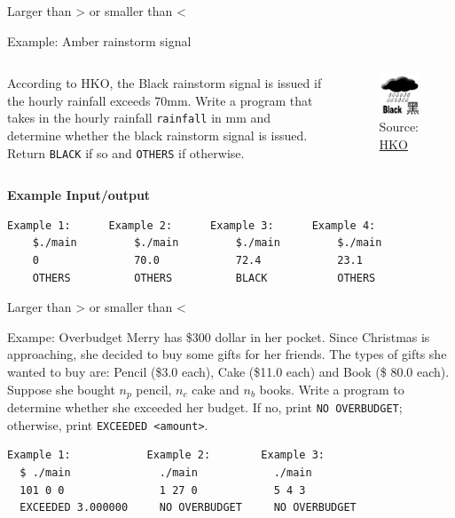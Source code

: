 \documentclass[10pt,xcolor={table,dvipsnames},t]{beamer}
\begin{document}
\begin{frame}[fragile]{Larger than > or smaller than <}
  \begin{exampleblock}{Example: Amber rainstorm signal}
    \begin{columns}
      According to HKO, the Black rainstorm signal is issued if the hourly rainfall exceeds 70mm. Write a program that takes in the hourly rainfall \texttt{rainfall} in mm and determine whether the black rainstorm signal is issued. Return \texttt{BLACK} if so and \texttt{OTHERS} if otherwise. 
      \begin{figure}
        \includegraphics{img/black-rain.png}
        \caption*{Source: \href{https://www.hko.gov.hk/en/wservice/warning/rainstor.htm}{HKO}}
      \end{figure}
    \end{columns}
  \end{exampleblock}
  \textbf{Example Input/output}
\begin{lstlisting}[language=bash]
    Example 1:      Example 2:      Example 3:      Example 4:
    $./main         $./main         $./main         $./main
    0               70.0            72.4            23.1
    OTHERS          OTHERS          BLACK           OTHERS
\end{lstlisting}
\end{frame}

\begin{frame}[fragile]{Larger than > or smaller than <}
  \begin{exampleblock}{Exampe: Overbudget}
    Merry has \$300 dollar in her pocket. Since Christmas is approaching, she decided to buy some gifts for her friends. The types of gifts she wanted to buy are: Pencil (\$3.0 each), Cake (\$11.0 each) and Book (\$ 80.0 each). Suppose she bought $n_p$ pencil, $n_c$ cake and $n_b$ books. Write a program to determine whether she exceeded her budget. If no, print \texttt{NO OVERBUDGET}; otherwise, print \texttt{EXCEEDED <amount>}.
  \end{exampleblock}
\begin{lstlisting}[language=bash]
  Example 1:            Example 2:        Example 3:
  $ ./main              ./main            ./main
  101 0 0               1 27 0            5 4 3
  EXCEEDED 3.000000     NO OVERBUDGET     NO OVERBUDGET    
\end{lstlisting}
\end{frame}
\end{document}
